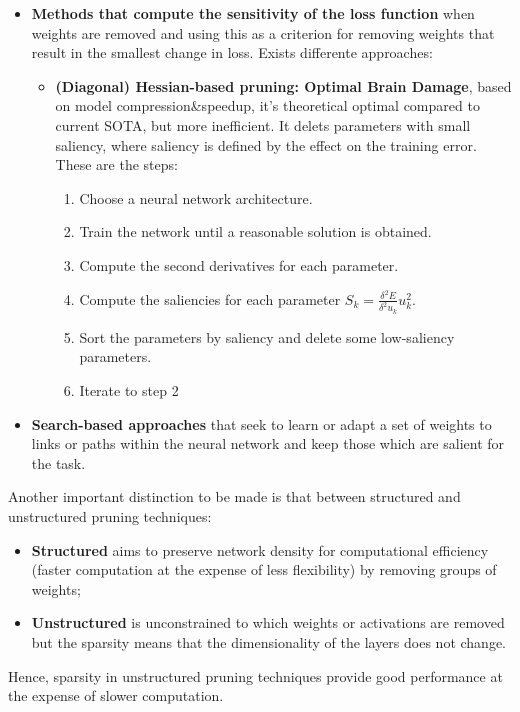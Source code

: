 \begin{itemize}
    
    \item \textbf{Methods that compute the sensitivity of the loss function} when weights are 
        removed and using this as a criterion for removing weights that result in the smallest 
        change in loss. Exists differente approaches:
        \begin{itemize}
            \item \textbf{(Diagonal) Hessian-based pruning: Optimal Brain Damage}, based 
            on model compression\&speedup, it's theoretical optimal compared to current
            SOTA, but more inefficient. It delets parameters with small saliency,
            where saliency is defined by the effect on the training error. These 
            are the steps:
            \begin{enumerate}
                \item Choose a neural network architecture.
                \item Train the network until a reasonable solution is obtained.
                \item Compute the second derivatives for each parameter.
                \item Compute the saliencies for each parameter $S_k = \frac{\delta^2E}{\delta^2 u_k} u_k^2$.
                \item Sort the parameters by saliency and delete some low-saliency parameters.
                \item Iterate to step 2
            \end{enumerate}
        \end{itemize}
        
    \item \textbf{Search-based approaches} that seek to learn or adapt a set of weights to links 
        or paths within the neural network and keep those which are salient for the task.
\end{itemize}

Another important distinction to be made is that between structured and unstructured 
pruning techniques:
\begin{itemize}
    \item \textbf{Structured} aims to preserve network density for computational efficiency 
        (faster computation at the expense of less flexibility) by removing groups of weights;
    \item \textbf{Unstructured} is unconstrained to which weights or activations are removed 
        but the sparsity means that the dimensionality of the layers does not change.
\end{itemize}
Hence, sparsity in unstructured pruning techniques provide good performance at the expense 
of slower computation.

